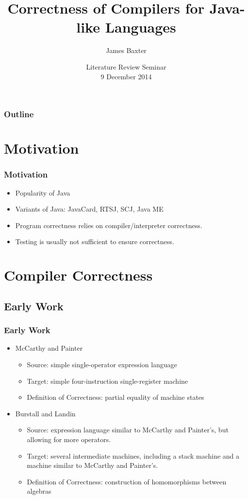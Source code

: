 \documentclass{beamer}
\title{Correctness of Compilers for Java-like Languages}
\author{James Baxter}
\date[2014-12-9]{Literature Review Seminar \\ 9 December 2014}
\newcommand{\footmake}[1]{
\ifthenelse{\equal{#1}{}}%
	{}%
	{\footnotetext{#1}}%
}
\newenvironment{slide}[2][fragile,environment=slide]
{\begin{frame}[#1]
	\frametitle{#2}\begin{refsegment}}
{\footmake{\printbibliography[segment=\therefsegment]}\end{refsegment}\end{frame}}
\begin{document}
\frame[plain]{\titlepage}

\begin{frame}
\frametitle{Outline}
\tableofcontents
\end{frame}

\section{Motivation}

\begin{slide}{Motivation}
\begin{itemize}
\item Popularity of Java\cite{gosling2013}
\item Variants of Java: JavaCard\cite{chen2000}, RTSJ\cite{gosling2000}, SCJ\cite{locke2013}, Java ME\cite{oracle2014}
\item Program correctness relies on compiler/interpreter correctness.
\item Testing is usually not sufficient to ensure correctness.
\end{itemize}
\end{slide}

\section{Compiler Correctness}

\frame{\sectionpage}

\subsection{Early Work}

\begin{slide}{Early Work}
  \begin{itemize}
  \item McCarthy and Painter\cite{mccarthy1967}
    \begin{itemize}
    \item Source: simple single-operator expression language
    \item Target: simple four-instruction single-register machine
    \item Definition of Correctness: partial equality of machine states
    \end{itemize}
  \item Burstall and Landin\cite{burstall1969}
    \begin{itemize}
    \item Source: expression language similar to McCarthy and Painter's, but allowing for more operators.
    \item Target: several intermediate machines, including a stack machine and a machine similar to McCarthy and Painter's.
    \item Definition of Correctness: construction of homomorphisms between algebras
    \end{itemize}
  \end{itemize}
\end{slide}
\end{document}
